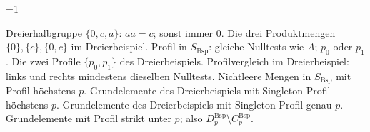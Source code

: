 \providecommand\NullproductsSymbolLegend{1}

\ifnum\NullproductsSymbolLegend=1 \SymbolLegendEnabledtrue\fi
\SymbolLegendCompacttrue

\NewDocumentCommand{}
\NewDocumentCommand{}
\NewDocumentCommand{}
\ExplSyntaxOn
\NewDocumentCommand{}
\ExplSyntaxOff
\NewDocumentCommand{}
\NewDocumentCommand{}
\NewDocumentCommand{}

%
  {Dreierhalbgruppe \(\{0,c,a\}\): \(aa=c\); sonst immer \(0\).}
%
  {Die drei Produktmengen \(\{0\},\{c\},\{0,c\}\) im Dreierbeispiel.}
%
  {Profil in \(S_{\mathrm{Bsp}}\): gleiche Nulltests wie \(A\); \(p_0\) oder \(p_1\).}
%
  {Die zwei Profile \(\{p_0,p_1\}\) des Dreierbeispiels.}
%
  {Profilvergleich im Dreierbeispiel: links und rechts mindestens dieselben Nulltests.}
%
  {Nichtleere Mengen in \(S_{\mathrm{Bsp}}\) mit Profil höchstens \(p\).}
%
  {Grundelemente des Dreierbeispiels mit Singleton-Profil höchstens \(p\).}
%
  {Grundelemente des Dreierbeispiels mit Singleton-Profil genau \(p\).}
%
  {Grundelemente mit Profil strikt unter \(p\); also \(D_p^{\mathrm{Bsp}}\setminus C_p^{\mathrm{Bsp}}\).}

